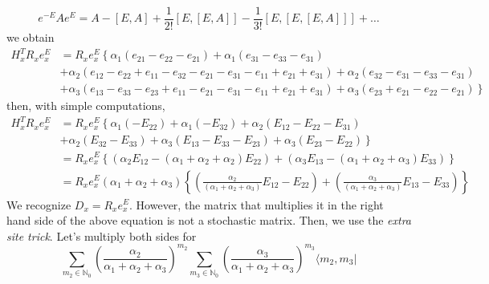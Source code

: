 \documentclass[11pt]{article}
\numberwithin{equation}{section}
\begin{document}
\begin{equation}
	e^{-E}Ae^{E}=A-\left[E,A\right]+\frac{1}{2!}\left[E,\left[E,A\right]\right]-\frac{1}{3!}\left[E,\left[E,\left[E,A\right]\right]\right]+\ldots
\end{equation}
we obtain 
\begin{equation}
	\begin{split}
	H^{T}_{x}R_{x}e_{x}^{E}&=R_{x}e_{x}^{E}\left\{\alpha_{1}\left(e_{21}-e_{22}-e_{21}\right)+\alpha_{1}\left(e_{31}-e_{33}-e_{31}\right)\right. \\ &+ \left. \alpha_{2}\left(e_{12}-e_{22}+e_{11}-e_{32}-e_{21}-e_{31}-e_{11}+e_{21}+e_{31}\right)+\alpha_{2}\left(e_{32}-e_{31}-e_{33}-e_{31}\right)\right. \\&+\left.
	\alpha_{3}\left(e_{13}-e_{33}-e_{23}+e_{11}-e_{21}-e_{31}-e_{11}+e_{21}+e_{31}\right)+\alpha_{3}\left(e_{23}+e_{21}-e_{22}-e_{21}\right)\right\}
	\end{split}
\end{equation}
then, with simple computations,
\begin{equation}\label{nonStochDuality}
	\begin{split}
	H^{T}_{x}R_{x}e_{x}^{E}&=R_{x}e_{x}^{E}\left\{\alpha_{1}(-E_{22})+\alpha_{1}(-E_{32})+\alpha_{2}(E_{12}-E_{22}-E_{31})\right.\\&+\left. \alpha_{2}(E_{32}-E_{33})+\alpha_{3}(E_{13}-E_{33}-E_{23})+\alpha_{3}(E_{23}-E_{22})\right\}\\&=
	R_{x}e_{x}^{E}\left\{\left(\alpha_{2}E_{12}-(\alpha_{1}+\alpha_{2}+\alpha_{2})E_{22}\right)+\left(\alpha_{3}E_{13}-(\alpha_{1}+\alpha_{2}+\alpha_{3})E_{33}\right)\right\}
	\\&=
	R_{x}e_{x}^{E}(\alpha_{1}+\alpha_{2}+\alpha_{3})\left\{\left(\frac{\alpha_{2}}{(\alpha_{1}+\alpha_{2}+\alpha_{3})}E_{12}-E_{22}\right)+\left(\frac{\alpha_{3}}{(\alpha_{1}+\alpha_{2}+\alpha_{3})}E_{13}-E_{33}\right)\right\}
\end{split}
\end{equation}
We recognize $D_{x}=R_{x}e^{E}_{x}$. However, the matrix that multiplies it in the right hand side of the above equation is not a stochastic matrix. Then, we use the \textit{extra site trick}. 
Let's multiply both sides for 
\begin{equation}
\sum_{m_{2}\in\mathbb{N}_{0}}	\left(\frac{\alpha_{2}}{\alpha_{1}+\alpha_{2}+\alpha_{3}}\right)^{m_{2}}\sum_{m_{3}\in \mathbb{N}_{0}}\left(\frac{\alpha_{3}}{\alpha_{1}+\alpha_{2}+\alpha_{3}}\right)^{m_{3}}\langle m_{2},m_{3}|
\end{equation}
\end{document}
